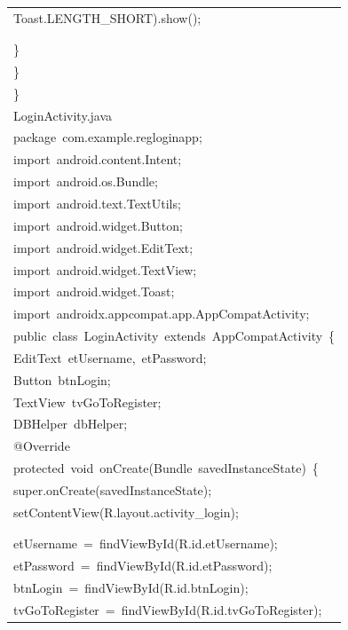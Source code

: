 \documentclass[a4paper,12pt]{article}
\begin{document}
\begin{longtable}{|p{}|}
{\ttfamily\small Toast.LENGTH\_SHORT).show();} \\
\strut \\
\strut \\
{\ttfamily\small \}} \\
{\ttfamily\small \}} \\
{\ttfamily\small \}} \\
{\ttfamily\small LoginActivity.java} \\
{\ttfamily\small package\ com.example.regloginapp;} \\
{\ttfamily\small import\ android.content.Intent;} \\
{\ttfamily\small import\ android.os.Bundle;} \\
{\ttfamily\small import\ android.text.TextUtils;} \\
{\ttfamily\small import\ android.widget.Button;} \\
{\ttfamily\small import\ android.widget.EditText;} \\
{\ttfamily\small import\ android.widget.TextView;} \\
{\ttfamily\small import\ android.widget.Toast;} \\
{\ttfamily\small import\ androidx.appcompat.app.AppCompatActivity;} \\
{\ttfamily\small public\ class\ LoginActivity\ extends\ AppCompatActivity\ \{} \\
{\ttfamily\small EditText\ etUsername,\ etPassword;} \\
{\ttfamily\small Button\ btnLogin;} \\
{\ttfamily\small TextView\ tvGoToRegister;} \\
{\ttfamily\small DBHelper\ dbHelper;} \\
{\ttfamily\small @Override} \\
{\ttfamily\small protected\ void\ onCreate(Bundle\ savedInstanceState)\ \{} \\
{\ttfamily\small super.onCreate(savedInstanceState);} \\
{\ttfamily\small setContentView(R.layout.activity\_login);} \\
\strut \\
\strut \\
{\ttfamily\small etUsername\ =\ findViewById(R.id.etUsername);} \\
{\ttfamily\small etPassword\ =\ findViewById(R.id.etPassword);} \\
{\ttfamily\small btnLogin\ =\ findViewById(R.id.btnLogin);} \\
{\ttfamily\small tvGoToRegister\ =\ findViewById(R.id.tvGoToRegister);} \\

\end{longtable}
\end{document}
